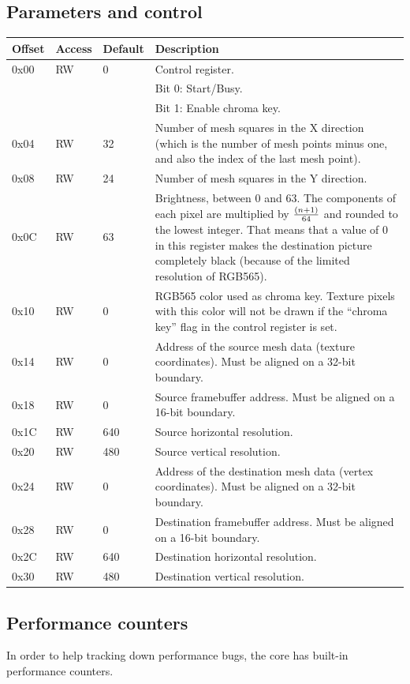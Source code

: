 \documentclass[a4paper,11pt]{article}
\begin{document}
\subsection{Parameters and control}
\begin{tabularx}{\textwidth}{|l|l|l|X|}
\hline
\bf{Offset} & \bf{Access} & \bf{Default} & \bf{Description} \\
\hline
0x00 & RW & 0 & Control register. \\
& & & Bit 0: Start/Busy.\\
& & & Bit 1: Enable chroma key. \\
\hline
0x04 & RW & 32 & Number of mesh squares in the X direction (which is the number of mesh points minus one, and also the index of the last mesh point). \\
\hline
0x08 & RW & 24 & Number of mesh squares in the Y direction. \\
\hline
0x0C & RW & 63 & Brightness, between 0 and 63. The components of each pixel are multiplied by $ (n+1) \over 64 $ and rounded to the lowest integer. That means that a value of 0 in this register makes the destination picture completely black (because of the limited resolution of RGB565). \\
\hline
0x10 & RW & 0 & RGB565 color used as chroma key. Texture pixels with this color will not be drawn if the ``chroma key'' flag in the control register is set. \\
\hline
0x14 & RW & 0 & Address of the source mesh data (texture coordinates). Must be aligned on a 32-bit boundary. \\
\hline
0x18 & RW & 0 & Source framebuffer address. Must be aligned on a 16-bit boundary. \\
\hline
0x1C & RW & 640 & Source horizontal resolution. \\
\hline
0x20 & RW & 480 & Source vertical resolution. \\
\hline
0x24 & RW & 0 & Address of the destination mesh data (vertex coordinates). Must be aligned on a 32-bit boundary. \\
\hline
0x28 & RW & 0 & Destination framebuffer address. Must be aligned on a 16-bit boundary. \\
\hline
0x2C & RW & 640 & Destination horizontal resolution. \\
\hline
0x30 & RW & 480 & Destination vertical resolution. \\
\hline
\end{tabularx}

\subsection{Performance counters}
In order to help tracking down performance bugs, the core has built-in performance counters.
\end{document}
